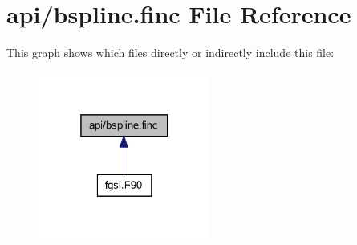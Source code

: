 \hypertarget{bspline_8finc}{}\section{api/bspline.finc File Reference}
\label{bspline_8finc}
This graph shows which files directly or indirectly include this file\+:\nopagebreak
\begin{figure}[H]
\begin{center}
\leavevmode
\includegraphics[width=160pt]{bspline_8finc__dep__incl}
\end{center}
\end{figure}

